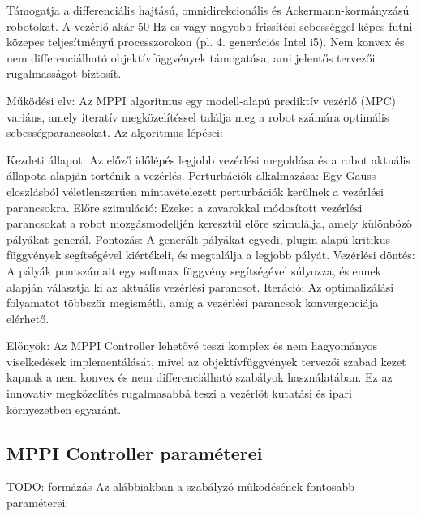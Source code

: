 Támogatja a differenciális hajtású, omnidirekcionális és Ackermann-kormányzású robotokat.
A vezérlő akár 50 Hz-es vagy nagyobb frissítési sebességgel képes futni közepes teljesítményű processzorokon (pl. 4. generációs Intel i5).
Nem konvex és nem differenciálható objektívfüggvények támogatása, ami jelentős tervezői rugalmasságot biztosít.

Működési elv:
Az MPPI algoritmus egy modell-alapú prediktív vezérlő (MPC) variáns, amely iteratív megközelítéssel találja meg a robot számára optimális sebességparancsokat. Az algoritmus lépései:

Kezdeti állapot: Az előző időlépés legjobb vezérlési megoldása és a robot aktuális állapota alapján történik a vezérlés.
Perturbációk alkalmazása: Egy Gauss-eloszlásból véletlenszerűen mintavételezett perturbációk kerülnek a vezérlési parancsokra.
Előre szimuláció: Ezeket a zavarokkal módosított vezérlési parancsokat a robot mozgásmodelljén keresztül előre szimulálja, amely különböző pályákat generál.
Pontozás: A generált pályákat egyedi, plugin-alapú kritikus függvények segítségével kiértékeli, és megtalálja a legjobb pályát.
Vezérlési döntés: A pályák pontszámait egy softmax függvény segítségével súlyozza, és ennek alapján választja ki az aktuális vezérlési parancsot.
Iteráció: Az optimalizálási folyamatot többször megismétli, amíg a vezérlési parancsok konvergenciája elérhető.

Előnyök:
Az MPPI Controller lehetővé teszi komplex és nem hagyományos viselkedések implementálását, mivel az objektívfüggvények tervezői szabad kezet kapnak a nem konvex és nem differenciálható szabályok használatában. Ez az innovatív megközelítés rugalmasabbá teszi a vezérlőt kutatási és ipari környezetben egyaránt.

\subsection{MPPI Controller paraméterei}
TODO: formázás
Az alábbiakban a szabályzó működésének fontosabb paraméterei:

